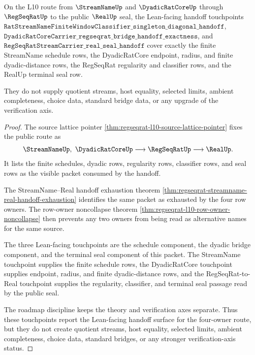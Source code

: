 \begin{theorem}
\label{thm:regseqrat-l10-owner-touchpoint-coverage}
On the L10 route from $\StreamNameUp$ and $\DyadicRatCoreUp$ through
$\RegSeqRatUp$ to the public $\RealUp$ seal, the Lean-facing handoff
touchpoints
$\texttt{RatStreamNameFiniteWindowClassifier\_singleton\_diagonal\_handoff}$,
$\texttt{DyadicRatCoreCarrier\_regseqrat\_bridge\_handoff\_exactness}$, and
$\texttt{RegSeqRatStreamCarrier\_real\_seal\_handoff}$ cover exactly the
finite StreamName schedule rows, the DyadicRatCore endpoint, radius, and
finite dyadic-distance rows, the RegSeqRat regularity and classifier rows,
and the RealUp terminal seal row.

They do not supply quotient streams, host equality, selected limits, ambient
completeness, choice data, standard bridge data, or any upgrade of the
verification axis.
\end{theorem}
\begin{proof}
The source lattice pointer
\autoref{thm:regseqrat-l10-source-lattice-pointer} fixes the public route as
$$
\StreamNameUp,\ \DyadicRatCoreUp \longrightarrow \RegSeqRatUp \longrightarrow \RealUp .
$$
It lists the finite schedules, dyadic rows, regularity rows, classifier rows,
and seal rows as the visible packet consumed by the handoff.

The StreamName--Real handoff exhaustion theorem
\autoref{thm:regseqrat-streamname-real-handoff-exhaustion} identifies the same
packet as exhausted by the four row owners. The row-owner noncollapse theorem
\autoref{thm:regseqrat-l10-row-owner-noncollapse} then prevents any two owners
from being read as alternative names for the same source.

The three Lean-facing touchpoints are the schedule component, the dyadic
bridge component, and the terminal seal component of this packet. The
StreamName touchpoint supplies the finite schedule rows, the DyadicRatCore
touchpoint supplies endpoint, radius, and finite dyadic-distance rows, and the
RegSeqRat-to-Real touchpoint supplies the regularity, classifier, and terminal
seal passage read by the public seal.

The roadmap discipline keeps the theory and verification axes separate. Thus
these touchpoints report the Lean-facing handoff surface for the four-owner
route, but they do not create quotient streams, host equality, selected
limits, ambient completeness, choice data, standard bridges, or any stronger
verification-axis status.
\end{proof}
